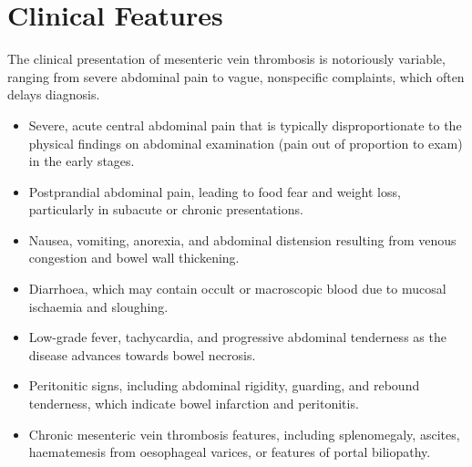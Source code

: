 \section*{Clinical Features}
The clinical presentation of mesenteric vein thrombosis is notoriously variable, ranging from severe abdominal pain to vague, nonspecific complaints, which often delays diagnosis.
\begin{itemize}
    \item Severe, acute central abdominal pain that is typically disproportionate to the physical findings on abdominal examination (pain out of proportion to exam) in the early stages.
    \item Postprandial abdominal pain, leading to food fear and weight loss, particularly in subacute or chronic presentations.
    \item Nausea, vomiting, anorexia, and abdominal distension resulting from venous congestion and bowel wall thickening.
    \item Diarrhoea, which may contain occult or macroscopic blood due to mucosal ischaemia and sloughing.
    \item Low-grade fever, tachycardia, and progressive abdominal tenderness as the disease advances towards bowel necrosis.
    \item Peritonitic signs, including abdominal rigidity, guarding, and rebound tenderness, which indicate bowel infarction and peritonitis.
    \item Chronic mesenteric vein thrombosis features, including splenomegaly, ascites, haematemesis from oesophageal varices, or features of portal biliopathy.
\end{itemize}

